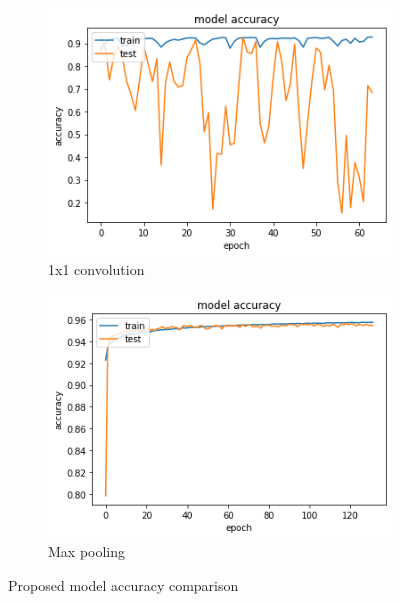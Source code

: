 \documentclass{article}
\begin{document}
\begin{figure}[H]
	\centering
	\begin{subfigure}{.5\textwidth}
		\centering
		\includegraphics[width=.9\linewidth]{./images/poly/new model_acc.png}
		\caption{1x1 convolution}
	\end{subfigure}%
	\begin{subfigure}{.5\textwidth}
		\centering
		\includegraphics[width=.9\linewidth]{./images/poly/new model_acc_new.png}
		\caption{Max pooling}
	\end{subfigure}
	\caption{Proposed model accuracy comparison}
	\label{fig:poly_new_acc}
\end{figure}
\end{document}
